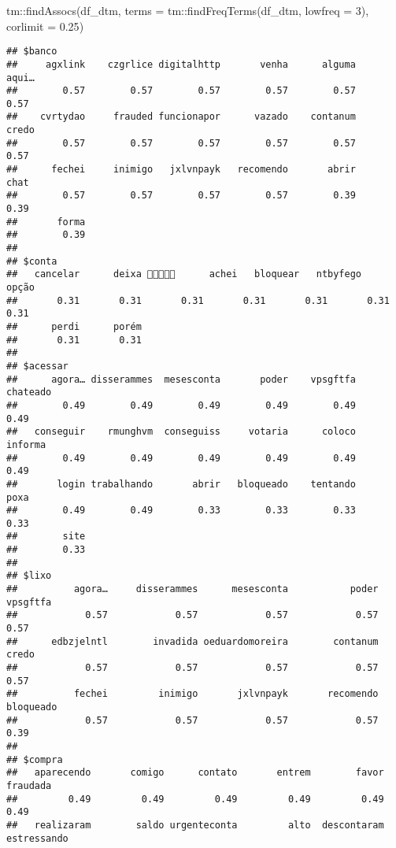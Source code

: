 \documentclass[
]{article}
\newenvironment{Shaded}{\begin{snugshade}}{\end{snugshade}}
\newcommand{\AttributeTok}[1]{\textcolor[rgb]{0.77,0.63,0.00}{#1}}
\newcommand{\DecValTok}[1]{\textcolor[rgb]{0.00,0.00,0.81}{#1}}
\newcommand{\FloatTok}[1]{\textcolor[rgb]{0.00,0.00,0.81}{#1}}
\newcommand{\FunctionTok}[1]{\textcolor[rgb]{0.00,0.00,0.00}{#1}}
\newcommand{\NormalTok}[1]{#1}
\newcommand{\SpecialCharTok}[1]{\textcolor[rgb]{0.00,0.00,0.00}{#1}}
\begin{document}
\begin{Shaded}
\begin{Highlighting}[]
\NormalTok{tm}\SpecialCharTok{::}\FunctionTok{findAssocs}\NormalTok{(df\_dtm, }\AttributeTok{terms =}\NormalTok{ tm}\SpecialCharTok{::}\FunctionTok{findFreqTerms}\NormalTok{(df\_dtm, }\AttributeTok{lowfreq =} \DecValTok{3}\NormalTok{), }\AttributeTok{corlimit =} \FloatTok{0.25}\NormalTok{)}
\end{Highlighting}
\end{Shaded}

\begin{verbatim}
## $banco
##     agxlink    czgrlice digitalhttp       venha      alguma       aqui… 
##        0.57        0.57        0.57        0.57        0.57        0.57 
##    cvrtydao     frauded funcionapor      vazado    contanum       credo 
##        0.57        0.57        0.57        0.57        0.57        0.57 
##      fechei     inimigo   jxlvnpayk   recomendo       abrir        chat 
##        0.57        0.57        0.57        0.57        0.39        0.39 
##       forma 
##        0.39 
## 
## $conta
##   cancelar      deixa 🤬🤬🤬🤬🤬      achei   bloquear   ntbyfego      opção 
##       0.31       0.31       0.31       0.31       0.31       0.31       0.31 
##      perdi      porém 
##       0.31       0.31 
## 
## $acessar
##      agora… disserammes  mesesconta       poder    vpsgftfa    chateado 
##        0.49        0.49        0.49        0.49        0.49        0.49 
##   conseguir    rmunghvm  conseguiss     votaria      coloco     informa 
##        0.49        0.49        0.49        0.49        0.49        0.49 
##       login trabalhando       abrir   bloqueado    tentando        poxa 
##        0.49        0.49        0.33        0.33        0.33        0.33 
##        site 
##        0.33 
## 
## $lixo
##          agora…     disserammes      mesesconta           poder        vpsgftfa 
##            0.57            0.57            0.57            0.57            0.57 
##      edbzjelntl        invadida oeduardomoreira        contanum           credo 
##            0.57            0.57            0.57            0.57            0.57 
##          fechei         inimigo       jxlvnpayk       recomendo       bloqueado 
##            0.57            0.57            0.57            0.57            0.39 
## 
## $compra
##   aparecendo       comigo      contato       entrem        favor     fraudada 
##         0.49         0.49         0.49         0.49         0.49         0.49 
##   realizaram        saldo urgenteconta         alto  descontaram  estressando 

\end{verbatim}
\end{document}
